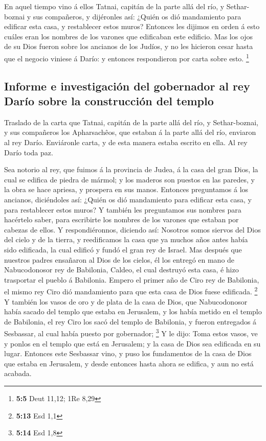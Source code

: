  En aquel tiempo vino á ellos Tatnai, capitán de la parte
allá del río, y Sethar-boznai y sus compañeros, y dijéronles así: ¿Quién
os dió mandamiento para edificar esta casa, y restablecer estos muros?
 Entonces les dijimos en orden á esto cuáles eran los
nombres de los varones que edificaban este edificio.  Mas
los ojos de su Dios fueron sobre los ancianos de los Judíos, y no les
hicieron cesar hasta que el negocio viniese á Darío: y entonces
respondieron por carta sobre esto. \footnote{\textbf{5:5} Deut 11,12;
  1Re 8,29}

\hypertarget{informe-e-investigaciuxf3n-del-gobernador-al-rey-daruxedo-sobre-la-construcciuxf3n-del-templo}{%
\subsection{Informe e investigación del gobernador al rey Darío sobre la
construcción del
templo}\label{informe-e-investigaciuxf3n-del-gobernador-al-rey-daruxedo-sobre-la-construcciuxf3n-del-templo}}

 Traslado de la carta que Tatnai, capitán de la parte allá
del río, y Sethar-boznai, y sus compañeros los Apharsachêos, que estaban
á la parte allá del río, enviaron al rey Darío. 
Enviáronle carta, y de esta manera estaba escrito en ella. Al rey Darío
toda paz.

 Sea notorio al rey, que fuimos á la provincia de Judea, á
la casa del gran Dios, la cual se edifica de piedra de mármol; y los
maderos son puestos en las paredes, y la obra se hace apriesa, y
prospera en sus manos.  Entonces preguntamos á los
ancianos, diciéndoles así: ¿Quién os dió mandamiento para edificar esta
casa, y para restablecer estos muros?  Y también les
preguntamos sus nombres para hacértelo saber, para escribirte los
nombres de los varones que estaban por cabezas de ellos. 
Y respondiéronnos, diciendo así: Nosotros somos siervos del Dios del
cielo y de la tierra, y reedificamos la casa que ya muchos años antes
había sido edificada, la cual edificó y fundó el gran rey de Israel.
 Mas después que nuestros padres ensañaron al Dios de los
cielos, él los entregó en mano de Nabucodonosor rey de Babilonia,
Caldeo, el cual destruyó esta casa, é hizo trasportar el pueblo á
Babilonia.  Empero el primer año de Ciro rey de
Babilonia, el mismo rey Ciro dió mandamiento para que esta casa de Dios
fuese edificada. \footnote{\textbf{5:13} Esd 1,1}  Y
también los vasos de oro y de plata de la casa de Dios, que
Nabucodonosor había sacado del templo que estaba en Jerusalem, y los
había metido en el templo de Babilonia, el rey Ciro los sacó del templo
de Babilonia, y fueron entregados á Sesbassar, al cual había puesto por
gobernador; \footnote{\textbf{5:14} Esd 1,8}  Y le dijo:
Toma estos vasos, ve y ponlos en el templo que está en Jerusalem; y la
casa de Dios sea edificada en su lugar.  Entonces este
Sesbassar vino, y puso los fundamentos de la casa de Dios que estaba en
Jerusalem, y desde entonces hasta ahora se edifica, y aun no está
acabada.

